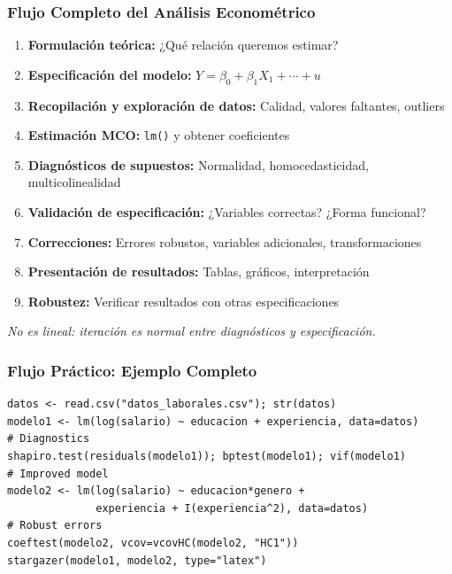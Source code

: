 \documentclass[aspectratio=169,11pt]{beamer}
\begin{document}
\begin{frame}
  \frametitle{Flujo Completo del Análisis Econométrico}

  \small
  \begin{enumerate}
    \item \textbf{Formulación teórica:} ¿Qué relación queremos estimar?
    \item \textbf{Especificación del modelo:} $Y = \beta_0 + \beta_1 X_1 + \cdots + u$
    \item \textbf{Recopilación y exploración de datos:} Calidad, valores faltantes, outliers
    \item \textbf{Estimación MCO:} \texttt{lm()} y obtener coeficientes
    \item \textbf{Diagnósticos de supuestos:} Normalidad, homocedasticidad, multicolinealidad
    \item \textbf{Validación de especificación:} ¿Variables correctas? ¿Forma funcional?
    \item \textbf{Correcciones:} Errores robustos, variables adicionales, transformaciones
    \item \textbf{Presentación de resultados:} Tablas, gráficos, interpretación
    \item \textbf{Robustez:} Verificar resultados con otras especificaciones
  \end{enumerate}

  \vspace{0.3cm}
  \small \textit{No es lineal: iteración es normal entre diagnósticos y especificación.}
\end{frame}

\begin{frame}[fragile]
  \frametitle{Flujo Práctico: Ejemplo Completo}

  \tiny
  \begin{lstlisting}
datos <- read.csv("datos_laborales.csv"); str(datos)
modelo1 <- lm(log(salario) ~ educacion + experiencia, data=datos)
# Diagnostics
shapiro.test(residuals(modelo1)); bptest(modelo1); vif(modelo1)
# Improved model
modelo2 <- lm(log(salario) ~ educacion*genero +
              experiencia + I(experiencia^2), data=datos)
# Robust errors
coeftest(modelo2, vcov=vcovHC(modelo2, "HC1"))
stargazer(modelo1, modelo2, type="latex")
  \end{lstlisting}
\end{frame}
\end{document}
